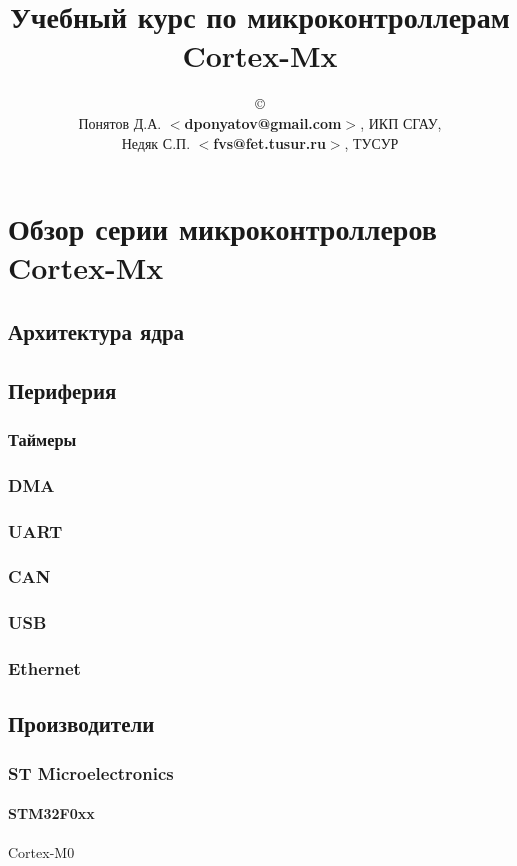 \documentclass[oneside]{book}
\newcommand{\cm}[1]{Cortex-M#1}
\newcommand{\cx}{\cm{x}}
\newcommand{\email}[1]{$<$\textbf{#1}$>$}
\begin{document}
\title{Учебный курс по микроконтроллерам \cx}
\author{\copyright\\
Понятов Д.А. \email{dponyatov@gmail.com}, ИКП СГАУ, \\
Недяк С.П. \email{fvs@fet.tusur.ru}, ТУСУР
}
\maketitle
\tableofcontents

\part{Обзор серии микроконтроллеров \cx}

\chapter{Архитектура ядра}
\chapter{Периферия}
\section{Таймеры}
\section{DMA}
\section{UART}
\section{CAN}
\section{USB}
\section{Ethernet}
\chapter{Производители}
\section{ST Microelectronics}
\subsection{STM32F0xx} \cm{0}
\end{document}
